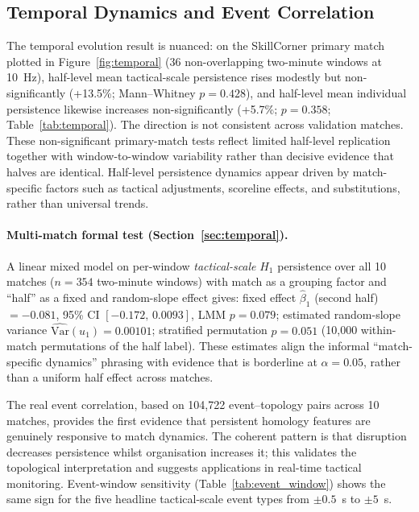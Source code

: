 \subsection{Temporal Dynamics and Event Correlation}

The temporal evolution result is nuanced: on the SkillCorner primary match plotted in Figure~\ref{fig:temporal} (36 non-overlapping two-minute windows at 10~Hz), half-level mean tactical-scale persistence rises modestly but non-significantly (+13.5\%; Mann--Whitney \(p=0.428\)), and half-level mean individual persistence likewise increases non-significantly (+5.7\%; \(p=0.358\); Table~\ref{tab:temporal}). The direction is not consistent across validation matches. These non-significant primary-match tests reflect limited half-level replication together with window-to-window variability rather than decisive evidence that halves are identical. Half-level persistence dynamics appear driven by match-specific factors such as tactical adjustments, scoreline effects, and substitutions, rather than universal trends.

\paragraph{Multi-match formal test (Section~\ref{sec:temporal}).}
A linear mixed model on per-window \emph{tactical-scale} $H_1$ persistence over all 10 matches ($n=354$ two-minute windows) with match as a grouping factor and ``half'' as a fixed and random-slope effect gives: fixed effect $\hat\beta_1$ (second half) $=-0.081$, 95\% CI $[-0.172,\,0.0093]$, LMM $p=0.079$; estimated random-slope variance $\widehat{\mathrm{Var}}(u_1)=0.00101$; stratified permutation $p=0.051$ (10{,}000 within-match permutations of the half label). These estimates align the informal ``match-specific dynamics'' phrasing with evidence that is borderline at $\alpha=0.05$, rather than a uniform half effect across matches.

The real event correlation, based on 104{,}722 event--topology pairs across 10 matches, provides the first evidence that persistent homology features are genuinely responsive to match dynamics. The coherent pattern is that disruption decreases persistence whilst organisation increases it; this validates the topological interpretation and suggests applications in real-time tactical monitoring. Event-window sensitivity (Table~\ref{tab:event_window}) shows the same sign for the five headline tactical-scale event types from $\pm0.5$~s to $\pm5$~s.

